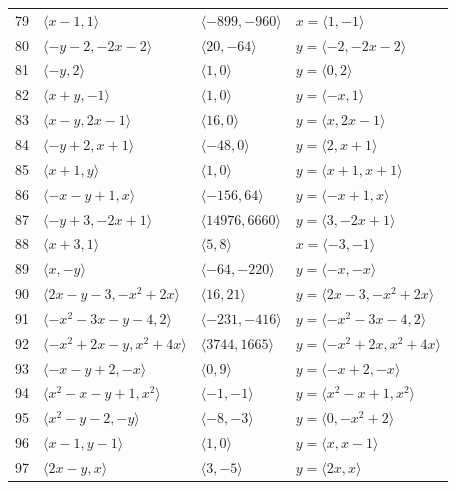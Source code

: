 \documentclass[11pt]{article}
\begin{document}
\begin{longtable}{@{}rlll@{}}
79 & $\langle x-1,1\rangle$ & $\langle -899,-960\rangle$ & $x=\langle 1,-1\rangle$\\
80 & $\langle -y-2,-2x-2\rangle$ & $\langle 20,-64\rangle$ & $y=\langle -2,-2x-2\rangle$\\
81 & $\langle -y,2\rangle$ & $\langle 1,0\rangle$ & $y=\langle 0,2\rangle$\\
82 & $\langle x+y,-1\rangle$ & $\langle 1,0\rangle$ & $y=\langle -x,1\rangle$\\
83 & $\langle x-y,2x-1\rangle$ & $\langle 16,0\rangle$ & $y=\langle x,2x-1\rangle$\\
84 & $\langle -y+2,x+1\rangle$ & $\langle -48,0\rangle$ & $y=\langle 2,x+1\rangle$\\
85 & $\langle x+1,y\rangle$ & $\langle 1,0\rangle$ & $y=\langle x+1,x+1\rangle$\\
86 & $\langle -x-y+1,x\rangle$ & $\langle -156,64\rangle$ & $y=\langle -x+1,x\rangle$\\
87 & $\langle -y+3,-2x+1\rangle$ & $\langle 14976,6660\rangle$ & $y=\langle 3,-2x+1\rangle$\\
88 & $\langle x+3,1\rangle$ & $\langle 5,8\rangle$ & $x=\langle -3,-1\rangle$\\
89 & $\langle x,-y\rangle$ & $\langle -64,-220\rangle$ & $y=\langle -x,-x\rangle$\\
90 & $\langle 2x-y-3,-x^{2}+2x\rangle$ & $\langle 16,21\rangle$ & $y=\langle 2x-3,-x^{2}+2x\rangle$\\
91 & $\langle -x^{2}-3x-y-4,2\rangle$ & $\langle -231,-416\rangle$ & $y=\langle -x^{2}-3x-4,2\rangle$\\
92 & $\langle -x^{2}+2x-y,x^{2}+4x\rangle$ & $\langle 3744,1665\rangle$ & $y=\langle -x^{2}+2x,x^{2}+4x\rangle$\\
93 & $\langle -x-y+2,-x\rangle$ & $\langle 0,9\rangle$ & $y=\langle -x+2,-x\rangle$\\
94 & $\langle x^{2}-x-y+1,x^{2}\rangle$ & $\langle -1,-1\rangle$ & $y=\langle x^{2}-x+1,x^{2}\rangle$\\
95 & $\langle x^{2}-y-2,-y\rangle$ & $\langle -8,-3\rangle$ & $y=\langle 0,-x^{2}+2\rangle$\\
96 & $\langle x-1,y-1\rangle$ & $\langle 1,0\rangle$ & $y=\langle x,x-1\rangle$\\
97 & $\langle 2x-y,x\rangle$ & $\langle 3,-5\rangle$ & $y=\langle 2x,x\rangle$\\
\end{longtable}
\endgroup
\end{document}
